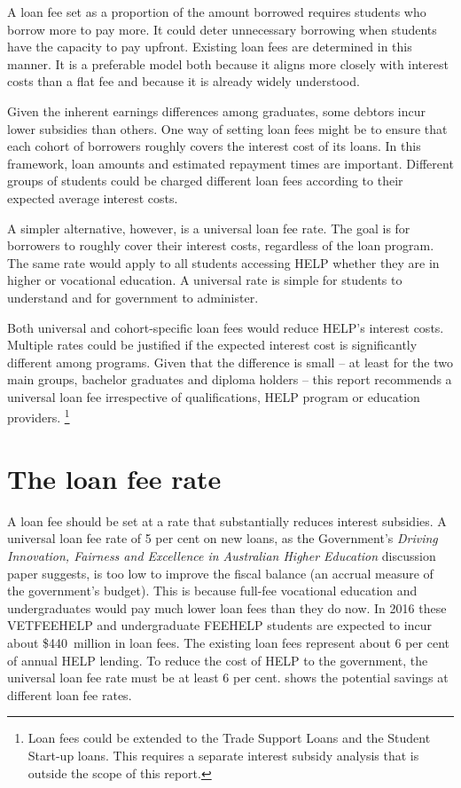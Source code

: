 \documentclass[embargoed]{grattan}
\begin{document}
A loan fee set as a proportion of the amount borrowed requires students who borrow more to pay more.
It could deter unnecessary borrowing when students have the capacity to pay upfront.
Existing loan fees are determined in this manner.
It is a preferable model both because it aligns more closely with interest costs than a flat fee and because it is already widely understood.

Given the inherent earnings differences among graduates, some debtors incur lower subsidies than others.
One way of setting loan fees might be to ensure that each cohort of borrowers roughly covers the interest cost of its loans.
In this framework, loan amounts and estimated repayment times are important.
Different groups of students could be charged different loan fees according to their expected average interest costs.

A simpler alternative, however, is a universal loan fee rate.
The goal is for borrowers to roughly cover their interest costs, regardless of the loan program.
The same rate would apply to all students accessing \gls{HELP} whether they are in higher or vocational education.
A universal rate is simple for students to understand and for government to administer.

Both universal and cohort-specific loan fees would reduce \gls{HELP}'s interest costs.
Multiple rates could be justified if the expected interest cost is significantly different among programs.
Given that the difference is small -- at least for the two main groups, bachelor graduates and diploma holders -- this report recommends a universal loan fee irrespective of qualifications, \gls{HELP} program or education providers.%
\footnote{Loan fees could be extended to the Trade Support Loans and the Student Start-up loans.
This requires a separate interest subsidy analysis that is outside the scope of this report.}

\section{The loan fee rate}\label{sec:the-loan-fee-rate}

A loan fee should be set at a rate that substantially reduces interest subsidies.
A universal loan fee rate of 5 per cent on new loans, as the Government's \emph{Driving Innovation, Fairness and Excellence in Australian Higher Education} discussion paper suggests, is too low to improve the fiscal balance (an accrual measure of the government's budget).
This is because full-fee vocational education and undergraduates would pay much lower loan fees than they do now.
In 2016 these \gls{VETFEEHELP} and undergraduate \gls{FEEHELP} students are expected to incur about \$440~million in loan fees.
The existing loan fees represent about 6 per cent of annual \gls{HELP} lending.
To reduce the cost of \gls{HELP} to the government, the universal loan fee rate must be at least 6 per cent.
 shows the potential savings at different loan fee rates.
\end{document}
